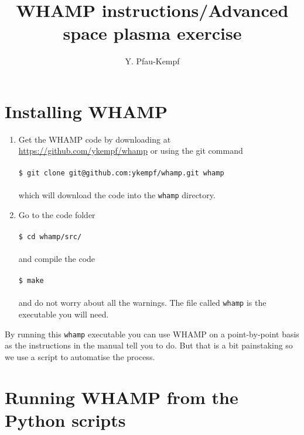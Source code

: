 \documentclass[a4paper,10pt]{article}
\title{WHAMP instructions/Advanced space plasma exercise}
\author{Y. Pfau-Kempf}
\begin{document}
\maketitle



\section{Installing WHAMP}

\begin{enumerate}
   \item Get the WHAMP code by downloading at \url{https://github.com/ykempf/whamp}
   or using the git command \\ \\
   \verb=$ git clone git@github.com:ykempf/whamp.git whamp= \\ \\
   which will download the code into the \verb=whamp= directory.
   
   \item Go to the code folder \\ \\
   \verb=$ cd whamp/src/= \\ \\
   and compile the code \\ \\
   \verb=$ make= \\ \\
   and do not worry about all the warnings. The file called \verb=whamp= is the executable you will need.
\end{enumerate}

By running this \verb=whamp= executable you can use WHAMP on a point-by-point basis as the instructions in the manual tell you to do. But that is a bit painstaking so we use a script to automatise the process.


\section{Running WHAMP from the Python scripts}
\end{document}
